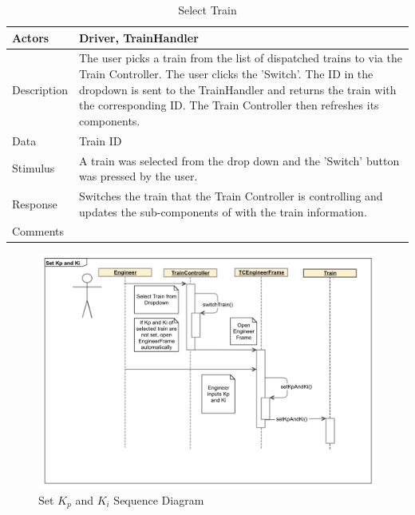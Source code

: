 \documentclass[]{article}
\begin{document}
\begin{table}[H]
	\centering
	\caption{Select Train}
	\begin{tabular}{|l|l|}
		\hline
		Actors & \parbox[t]{10cm}{Driver, TrainHandler} \\ \hline
		Description & \parbox[t]{10cm}{The user picks a train from the list of dispatched trains to via the Train Controller. The user clicks the 'Switch'. The ID in the dropdown is sent to the TrainHandler and returns the train with the corresponding ID. The Train Controller then refreshes its components.} \\ \hline
		Data &  \parbox[t]{10cm}{Train ID} \\ \hline
		Stimulus &  \parbox[t]{10cm}{ A train was selected from the drop down and the 'Switch' button was pressed by the user. } \\ \hline
		Response & \parbox[t]{10cm}{Switches the train that the Train Controller is controlling and updates the sub-components of with the train information.  }\\ \hline
		Comments & \parbox[t]{10cm}{}  \\ \hline
	\end{tabular}
\end{table}


\begin{figure}[H]
	\centering
	\includegraphics[width=\textwidth]{tc_setKpAndKi_usecase}
	\caption{Set $K_p$ and $K_i$ Sequence Diagram}
\end{figure}
\end{document}
